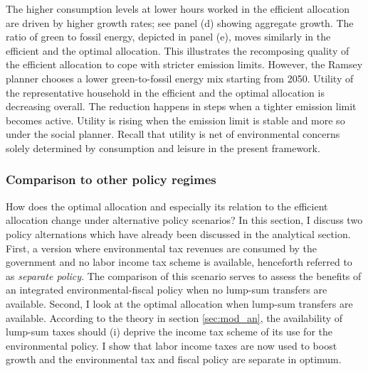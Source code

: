 The higher consumption levels at lower hours worked in the efficient allocation are driven by higher growth rates; see panel (d) showing aggregate growth. The ratio of green to fossil energy, depicted in panel (e), moves similarly in the efficient and the optimal allocation. This illustrates the recomposing quality of the efficient allocation to cope with stricter emission limits. However, the Ramsey planner chooses a lower green-to-fossil energy mix starting from 2050. Utility of the representative household in the efficient and the optimal allocation is decreasing overall. The reduction happens in steps when a tighter emission limit becomes active. Utility is rising when the emission limit is stable and more so under the social planner. Recall that utility is net of environmental concerns solely determined by consumption and leisure in the present framework. 

\subsubsection{Comparison to other policy regimes}
How does the optimal allocation and especially its relation to the efficient allocation change under alternative policy scenarios?
In this section, I discuss two policy alternations which have already been discussed in the analytical section. First, a version where environmental tax revenues are consumed by the government and no labor income tax scheme is available, henceforth referred to as \textit{separate policy}. The comparison of this scenario serves to assess the benefits of an integrated environmental-fiscal policy when no lump-sum transfers are available. 
Second, I look at the optimal allocation when lump-sum transfers are available. According to the theory in section \ref{sec:mod_an}, the availability of lump-sum taxes should (i) deprive the income tax scheme of its use for the environmental policy. I show that labor income taxes are now used to boost growth and the environmental tax and fiscal policy are separate in optimum. 

